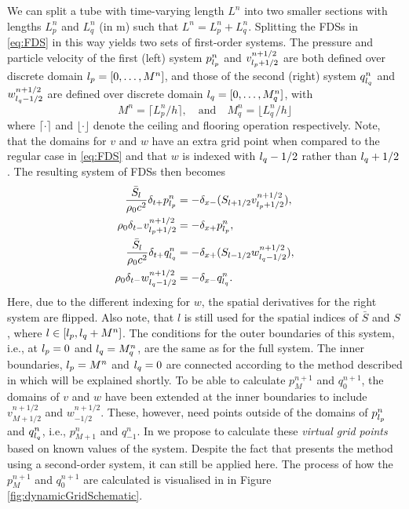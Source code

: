 We can split a tube with time-varying length $L^n$ into two smaller sections with lengths $L_p^n$ and $L_q^n$ (in m) such that $L^n = L_p^n + L_q^n$. Splitting the FDSs in \eqref{eq:FDS} in this way yields two sets of first-order systems. The pressure and particle velocity of the first (left) system $p_{l_p}^n$ and $v_{{l_p}+1/2}^{n+1/2}$ are both defined over discrete domain ${l_p} = [0, \hdots, M^n]$, and those of the second (right) system $q_{l_q}^n$ and $w_{{l_q}-1/2}^{n+1/2}$ are defined over discrete domain ${l_q} = [0, \hdots, M_q^n]$, with
\begin{equation}\label{eq:MMq}
    M^n = \lceil L_p^n/h\rceil, \quad \text{and} \quad M_q^n = \lfloor L_q^n/h\rfloor
\end{equation} where $\lceil \cdot \rceil$ and $\lfloor \cdot \rfloor$ denote the ceiling and flooring operation respectively. Note, that the domains for $v$ and $w$ have an extra grid point when compared to the regular case in \eqref{eq:FDS} and that $w$ is indexed with ${l_q}-1/2$ rather than ${l_q}+1/2$. The resulting system of FDSs then becomes
\begin{subequations}\label{eq:firstOrderPairs}
    \begin{align}
        \frac{\bar S_{l}}{\rho_0 c^2}\delta_{t+}p_{l_p}^n &= -\delta_{x-}(S_{{l}+1/2}v_{{l_p}+1/2}^{n+1/2}),\label{eq:discPressureP}\\
        \rho_0 \delta_{t-}v_{{l_p}+1/2}^{n+1/2}&=-\delta_{x+}p_{l_p}^n,\label{eq:discVelocityV}\\
        \frac{\bar S_{l}}{\rho_0 c^2}\delta_{t+}q_{l_q}^n &= -\delta_{x+}(S_{{l}-1/2}w_{{l_q}-1/2}^{n+1/2}),\label{eq:discPressureQ}\\
        \rho_0 \delta_{t-}w_{{l_q}-1/2}^{n+1/2}&=-\delta_{x-}q_{l_q}^n.\label{eq:discVelocityW}
    \end{align}
\end{subequations}
Here, due to the different indexing for $w$, the spatial derivatives for the right system are flipped. Also note, that $l$ is still used for the spatial indices of $\bar S$ and $S$, where $l\in [{l_p}, {l_q}+M^n]$. The conditions for the outer boundaries of this system, i.e., at ${l_p} = 0$ and ${l_q} = M_q^n$, are the same as for the full system. The inner boundaries, ${l_p} = M^n$ and ${l_q} = 0$ are connected according to the method described in \cite{Willemsen2021} which will be explained shortly.
To be able to calculate $p_M^{n+1}$ and $q_0^{n+1}$, the domains of $v$ and $w$ have been extended at the inner boundaries to include $v_{M+1/2}^{n+1/2}$ and $w_{-1/2}^{n+1/2}$. These, however, need points outside of the domains of $p_{l_p}^n$ and $q_{l_q}^n$, i.e., $p_{M+1}^n$ and $q_{-1}^n$. In \cite{Willemsen2021} we propose to calculate these \textit{virtual grid points} based on known values of the system. Despite the fact that \cite{Willemsen2021} presents the method using a second-order system, it can still be applied here. The process of how the $p_M^{n+1}$ and $q_0^{n+1}$ are calculated is visualised in in Figure \ref{fig:dynamicGridSchematic}.

